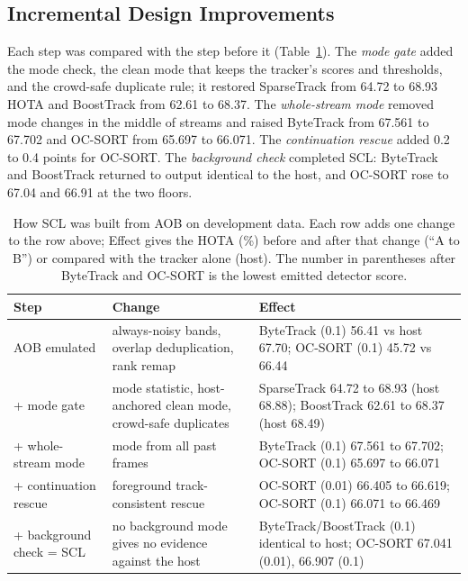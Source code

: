 \subsection{Incremental Design Improvements}\label{sec:scl-steps}
Each step was compared with the step before it (Table~\ref{tab:scl-ablation}). The \emph{mode gate} added the mode check, the clean mode that keeps the tracker's scores and thresholds, and the crowd-safe duplicate rule; it restored SparseTrack from 64.72 to 68.93 HOTA and BoostTrack from 62.61 to 68.37. The \emph{whole-stream mode} removed mode changes in the middle of streams and raised ByteTrack from 67.561 to 67.702 and OC-SORT from 65.697 to 66.071. The \emph{continuation rescue} added 0.2 to 0.4 points for OC-SORT. The \emph{background check} completed SCL: ByteTrack and BoostTrack returned to output identical to the host, and OC-SORT rose to 67.04 and 66.91 at the two floors.

\begin{table}[tbp]
\centering
\caption{How SCL was built from AOB on development data. Each row adds one change to the row above; Effect gives the HOTA (\%) before and after that change (``A to B'') or compared with the tracker alone (host). The number in parentheses after ByteTrack and OC-SORT is the lowest emitted detector score.}
\label{tab:scl-ablation}
\begin{tabular}{>{\raggedright\arraybackslash}p{3.4cm}>{\raggedright\arraybackslash}p{4.4cm}>{\raggedright\arraybackslash}p{6.6cm}}
\toprule
Step & Change & Effect\\
\midrule
AOB emulated & always-noisy bands, overlap deduplication, rank remap & ByteTrack (0.1) 56.41 vs host 67.70; OC-SORT (0.1) 45.72 vs 66.44\\
+ mode gate & mode statistic, host-anchored clean mode, crowd-safe duplicates & SparseTrack 64.72 to 68.93 (host 68.88); BoostTrack 62.61 to 68.37 (host 68.49)\\
+ whole-stream mode & mode from all past frames & ByteTrack (0.1) 67.561 to 67.702; OC-SORT (0.1) 65.697 to 66.071\\
+ continuation rescue & foreground track-consistent rescue & OC-SORT (0.01) 66.405 to 66.619; OC-SORT (0.1) 66.071 to 66.469\\
+ background check = SCL & no background mode gives no evidence against the host & ByteTrack/BoostTrack (0.1) identical to host; OC-SORT 67.041 (0.01), 66.907 (0.1)\\
\bottomrule
\end{tabular}
\end{table}

